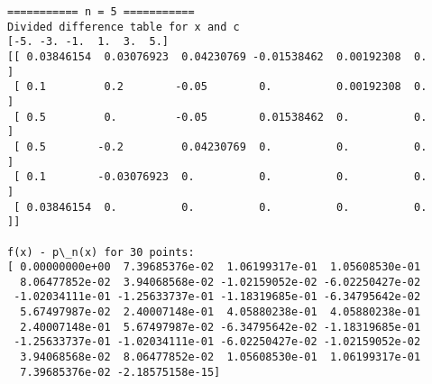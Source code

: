 \documentclass[11pt]{article}
\begin{document}
    \begin{Verbatim}[commandchars=\\\{\}]
=========== n = 5 ===========
Divided difference table for x and c
[-5. -3. -1.  1.  3.  5.]
[[ 0.03846154  0.03076923  0.04230769 -0.01538462  0.00192308  0.        ]
 [ 0.1         0.2        -0.05        0.          0.00192308  0.        ]
 [ 0.5         0.         -0.05        0.01538462  0.          0.        ]
 [ 0.5        -0.2         0.04230769  0.          0.          0.        ]
 [ 0.1        -0.03076923  0.          0.          0.          0.        ]
 [ 0.03846154  0.          0.          0.          0.          0.        ]]

f(x) - p\_n(x) for 30 points:
[ 0.00000000e+00  7.39685376e-02  1.06199317e-01  1.05608530e-01
  8.06477852e-02  3.94068568e-02 -1.02159052e-02 -6.02250427e-02
 -1.02034111e-01 -1.25633737e-01 -1.18319685e-01 -6.34795642e-02
  5.67497987e-02  2.40007148e-01  4.05880238e-01  4.05880238e-01
  2.40007148e-01  5.67497987e-02 -6.34795642e-02 -1.18319685e-01
 -1.25633737e-01 -1.02034111e-01 -6.02250427e-02 -1.02159052e-02
  3.94068568e-02  8.06477852e-02  1.05608530e-01  1.06199317e-01
  7.39685376e-02 -2.18575158e-15]


\end{Verbatim}
\end{document}
